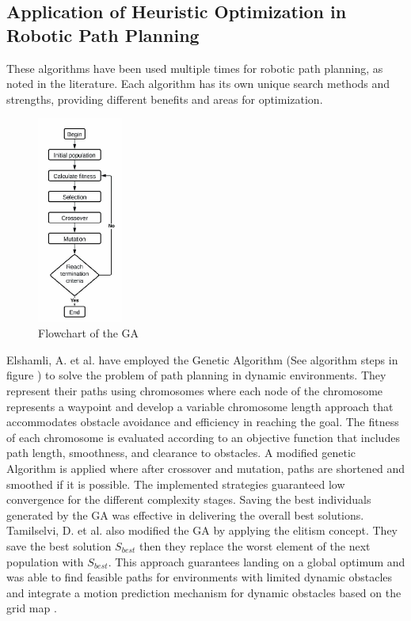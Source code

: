 \subsection{Application of Heuristic Optimization in Robotic Path Planning}
These algorithms have been used multiple times for robotic path planning, as noted in the literature. 
Each algorithm has its own unique search methods and strengths, providing different benefits and areas for optimization.
  


\begin{figure}
    \centering
    \includegraphics[width=0.25\textwidth]{images/Chap1/GA.jpg}
    \caption{Flowchart of the GA \cite{R39}}
    \label{GA}
\end{figure}

Elshamli, A. et al. \cite{R17} have employed the Genetic Algorithm (See algorithm steps in figure ) to solve 
the problem of path planning in dynamic environments. They represent their paths using chromosomes where each node of the chromosome represents 
a waypoint and develop a variable chromosome length approach that accommodates obstacle avoidance and efficiency 
in reaching the goal. The fitness of each chromosome is evaluated according to an objective function that includes path length, smoothness, 
and clearance to obstacles. A modified genetic Algorithm is applied where after crossover and mutation, paths are 
shortened and smoothed if it is possible. The implemented strategies guaranteed low convergence for the different 
complexity stages. Saving the best individuals generated by the GA was effective in delivering the overall best solutions.
Tamilselvi, D. et al. also modified the GA by applying the elitism concept. They save the best solution
\(S_{best}\) then they replace the worst element of the next population with \(S_{best}\). This approach guarantees
landing on a global optimum and was able to find feasible paths for environments with limited 
dynamic obstacles and integrate a motion prediction mechanism for dynamic obstacles based on the grid map \cite{R38}.

